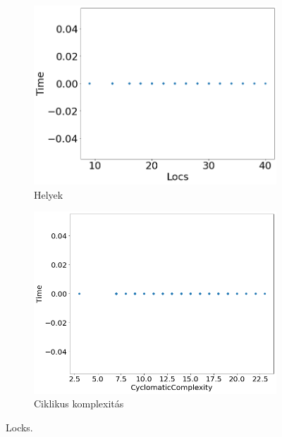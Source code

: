 \begin{figure}[ht]
\begin{subfigure}[b]{0.5\linewidth}
		\includegraphics[width=0.95\linewidth]{figures/locks/locs.png} 
		\caption{Helyek} 
		\label{fig7:c} 
	\end{subfigure}%
	\begin{subfigure}[b]{0.5\linewidth}
		\centering
		\includegraphics[width=0.95\linewidth]{figures/locks/cc.png} 
		\caption{Ciklikus komplexitás} 
		\label{fig7:d} 
	\end{subfigure} 
	\caption{Locks.\label{fig:locks} }
\end{figure}

